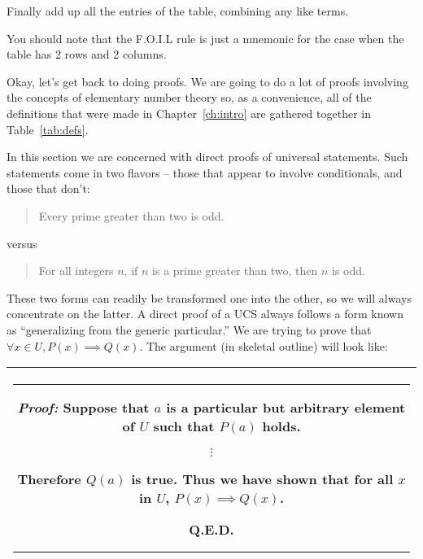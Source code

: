 Finally add up all the entries of the table, combining any like terms.

You should note that the F.O.I.L rule is just a mnemonic for the case when 
the table has 2 rows and 2 columns.

Okay, let's get back to doing proofs.  We are going to do a lot of
proofs involving the concepts of elementary number theory so, as a 
convenience, all of the definitions that were made in Chapter~\ref{ch:intro}
are gathered together in Table~\ref{tab:defs}.



\clearpage 

In this section we are concerned with 
direct proofs of universal statements.  
Such statements come in two flavors -- those that appear to involve 
conditionals, and those that don't:

\begin{quote} Every prime greater than two is odd.
\end{quote}

versus

\begin{quote} For all integers $n$, if $n$ is a prime greater than two, then $n$ is odd.
\end{quote}

These two forms can readily be transformed one into the other, so 
we will always concentrate on the latter.  A direct proof of a UCS
always follows a form known as 
``generalizing from the generic particular.''
We are trying to prove that $\forall x \in U, P(x) \implies Q(x)$.  
The argument (in skeletal outline) will look like:
\medskip

\begin{center}
\begin{tabular}{|c|} \hline
\rule{16pt}{0pt}\begin{minipage}{.75\textwidth}
\rule{0pt}{20pt} {\em Proof:} Suppose that $a$ is a particular but arbitrary element of $U$ such 
that $P(a)$ holds.

\begin{center}
$\vdots$
\end{center}

Therefore $Q(a)$ is true. \newline
Thus we have shown that for all $x$ in $U$, $P(x) \implies Q(x)$.\newline
\rule{0pt}{0pt} \hspace{\fill} Q.E.D. \rule[-10pt]{0pt}{16pt}
\end{minipage} \rule{16pt}{0pt} \\ \hline
\end{tabular}
\end{center}
\medskip

